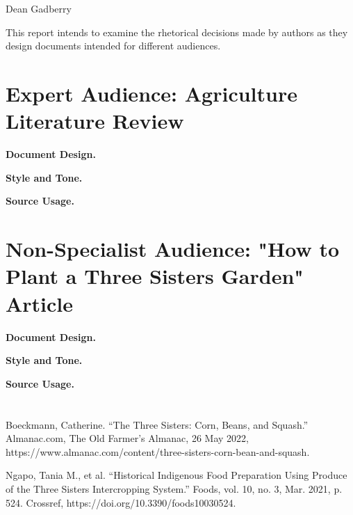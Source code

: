 \documentclass[12pt,a4paper,english]{article}
\begin{document}
\section*{}
\begin{center}
Dean Gadberry
\end{center}
This report intends to examine the rhetorical decisions made by authors as they design documents intended for different audiences.
\section*{Expert Audience: Agriculture Literature Review}
\textbf{Document Design.}

\par
\textbf{Style and Tone.}

\textbf{Source Usage.}

\section*{Non-Specialist Audience: "How to Plant a Three Sisters Garden" Article}
\textbf{Document Design.}
\par
\textbf{Style and Tone.}

\textbf{Source Usage.}

\section*{}
\begin{hangparas}{2em}{1}
  Boeckmann, Catherine. “The Three Sisters: Corn, Beans, and Squash.” Almanac.com, The Old Farmer's Almanac, 26 May 2022, https://www.almanac.com/content/three-sisters-corn-bean-and-squash. 
  \par
  Ngapo, Tania M., et al. “Historical Indigenous Food Preparation Using Produce of the Three Sisters Intercropping System.” Foods, vol. 10, no. 3, Mar. 2021, p. 524. Crossref, https://doi.org/10.3390/foods10030524.
\end{hangparas}
\end{document}
